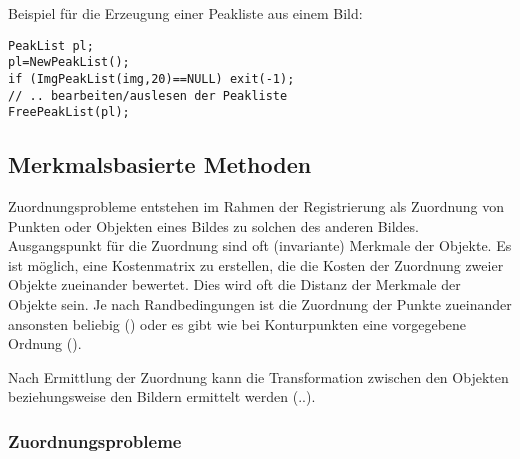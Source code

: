 

Beispiel für die Erzeugung einer Peakliste aus einem Bild:
\begprogr
\begin{verbatim}
PeakList pl;
pl=NewPeakList();
if (ImgPeakList(img,20)==NULL) exit(-1);
// .. bearbeiten/auslesen der Peakliste
FreePeakList(pl);
\end{verbatim}
\endprogr

\subsection{Merkmalsbasierte Methoden}

Zuordnungsprobleme entstehen im Rahmen der Registrierung als Zuordnung von
Punkten oder Objekten eines Bildes zu solchen des anderen
Bildes. Ausgangspunkt für die Zuordnung sind oft (invariante) Merkmale der 
Objekte. Es ist möglich, eine Kostenmatrix zu erstellen, die die Kosten der
Zuordnung zweier Objekte zueinander bewertet. Dies wird oft die Distanz der
Merkmale der Objekte sein. Je nach Randbedingungen ist die Zuordnung der
Punkte zueinander ansonsten beliebig () oder es gibt 
wie bei Konturpunkten eine vorgegebene Ordnung ().

Nach Ermittlung der Zuordnung kann die Transformation zwischen den Objekten
beziehungsweise den Bildern ermittelt werden (..).

\subsubsection{Zuordnungsprobleme}


